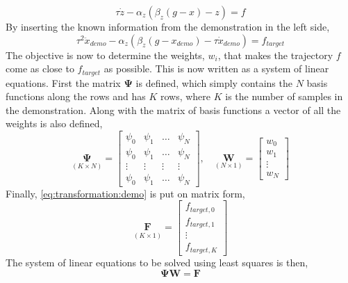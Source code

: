 \documentclass[../main.tex]{subfiles}
\begin{document}
\begin{equation}\label{eq:system:forcing}
    \tau \dot{z} -\alpha_z (\beta_z (g-x) - z) = f
\end{equation}
By inserting the known information from the demonstration in the left side,
\begin{equation} \label{eq:transformation:demo}
    \tau^2 \ddot{x}_{demo} - \alpha_z(\beta_z(g-x_{demo}) - \tau \dot{x}_{demo}) = f_{target}
\end{equation}
The objective is now to determine the weights, $w_i$, that makes the trajectory $f$ come as close to $f_{target}$ as possible.
This is now written as a system of linear equations. First the matrix $\boldsymbol{\Psi}$ is defined, which simply contains the $N$ basis functions along the rows and has $K$ rows, where $K$ is the number of samples in the demonstration. Along with the matrix of basis functions a vector of all the weights is also defined,
\begin{equation}
    \underset{(K \times N)}{\boldsymbol{\Psi}} = \begin{bmatrix} \psi_0 & \psi_1 & \dots & \psi_N \\ \psi_0 & \psi_1 & \dots & \psi_N \\ \vdots & \vdots & \vdots & \vdots \\\psi_0 & \psi_1 & \dots & \psi_N \end{bmatrix}, \quad \underset{(N\times 1)}{\boldsymbol{W}} = \begin{bmatrix} w_0 \\ w_1 \\ \vdots \\ w_N \end{bmatrix} 
\end{equation}
Finally, \autoref{eq:transformation:demo} is put on matrix form,
\begin{equation}
    \underset{(K \times 1)}{\boldsymbol{F}} = \begin{bmatrix} f_{target,0} \\ f_{target,1} \\ \vdots \\ f_{target,K} \end{bmatrix}
\end{equation}
The system of linear equations to be solved using least squares is then,
\begin{equation}\label{eq:system:sole}
    \boldsymbol{\Psi}\boldsymbol{W} = \boldsymbol{F}
\end{equation}
\end{document}
